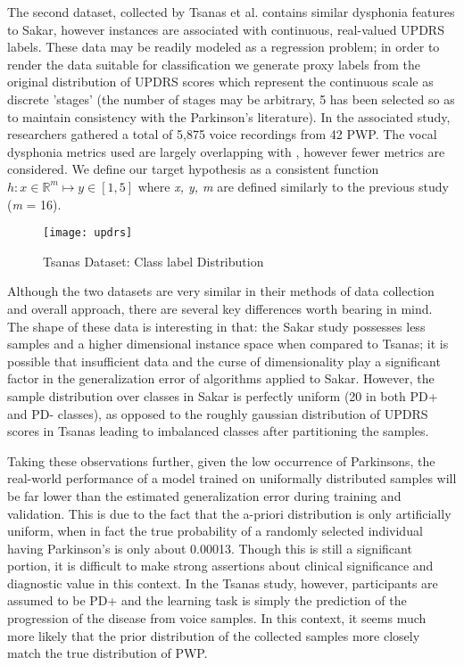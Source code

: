 \documentclass[12pt]{article}
\begin{document}
The second dataset, collected by Tsanas et al.\cite{Tsanas2010} contains similar dysphonia features to Sakar, however instances are associated with continuous, real-valued UPDRS labels. These data may be readily modeled as a regression problem; in order to render the data suitable for classification we generate proxy labels from the original distribution of UPDRS scores which represent the continuous scale as discrete 'stages' (the number of stages may be arbitrary, 5 has been selected so as to maintain consistency with the Parkinson's literature). In the associated study, researchers gathered a total of 5,875 voice recordings from 42 PWP. The vocal dysphonia metrics used are largely overlapping with \cite{Sakar2013}, however fewer metrics are considered. We define our target hypothesis as a consistent function $ h : x \in \mathbb{R}^m \mapsto y \in [1,5] $ where \textit{x, y, m} are defined similarly to the previous study (\textit{m} = 16).

\begin{figure}
    \centering
    \texttt{[image: updrs]}
    \caption{Tsanas Dataset: Class label Distribution}
\end{figure}

Although the two datasets are very similar in their methods of data collection and overall approach, there are several key differences worth bearing in mind. The shape of these data is interesting in that: the Sakar study possesses less samples and a higher dimensional instance space when compared to Tsanas; it is possible that insufficient data and the curse of dimensionality play a significant factor in the generalization error of algorithms applied to Sakar. However, the sample distribution over classes in Sakar is perfectly uniform (20 in both PD+ and PD- classes), as opposed to the roughly gaussian distribution of UPDRS scores in Tsanas leading to imbalanced classes after partitioning the samples.

Taking these observations further, given the low occurrence of Parkinsons, the real-world performance of a model trained on uniformally distributed samples will be far lower than the estimated generalization error during training and validation. This is due to the fact that the a-priori distribution is only artificially uniform, when in fact the true probability of a randomly selected individual having Parkinson's is only about 0.00013. Though this is still a significant portion, it is difficult to make strong assertions about clinical significance and diagnostic value in this context. In the Tsanas study, however, participants are assumed to be PD+ and the learning task is simply the prediction of the progression of the disease from voice samples. In this context, it seems much more likely that the prior distribution of the collected samples more closely match the true distribution of PWP.
\end{document}
